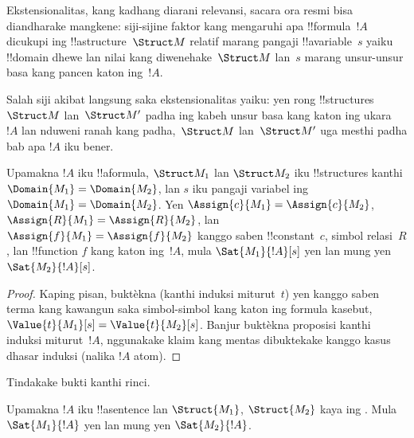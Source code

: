 \documentclass[../../../include/open-logic-section]{subfiles}
\begin{document}


\begin{explain}
Ekstensionalitas, kang kadhang diarani relevansi, sacara
ora resmi bisa diandharake mangkene: siji-sijine faktor
kang mengaruhi apa !!{formula}~$!A$ dicukupi ing
!!a{structure}~$\Struct M$ relatif marang pangaji
!!a{variable}~$s$ yaiku !!{domain} dhewe lan
nilai kang diwenehake~$\Struct M$ lan~$s$ marang
unsur-unsur basa kang pancen katon ing~$!A$.

Salah siji akibat langsung saka ekstensionalitas yaiku:
yen rong !!{structure}s~$\Struct M$ lan~$\Struct M'$
padha ing kabeh unsur basa kang katon ing ukara~$!A$
lan nduweni ranah kang padha,~$\Struct M$ lan~$\Struct M'$
uga mesthi padha bab apa $!A$ iku bener.
\end{explain}

\begin{prop}[Ekstensionalitas]
  Upamakna $!A$ iku !!a{formula}, $\Struct M_1$ lan
  $\Struct M_2$ iku !!{structure}s kanthi
  $\Domain{M_1} = \Domain{M_2}$, lan $s$ iku
  pangaji variabel ing $\Domain{M_1} = \Domain{M_2}$.
  Yen $\Assign{c}{M_1} = \Assign{c}{M_2}$,
  $\Assign{R}{M_1}=\Assign{R}{M_2}$, lan
  $\Assign{f}{M_1} = \Assign{f}{M_2}$ kanggo saben
  !!{constant}~$c$, simbol relasi~$R$, lan
  !!{function} $f$ kang katon ing~$!A$, mula
  $\Sat{M_1}{!A}[s]$ yen lan mung yen $\Sat{M_2}{!A}[s]$.
\end{prop}

\begin{proof}
  Kaping pisan, buktèkna (kanthi induksi miturut~$t$)
  yen kanggo saben terma kang kawangun saka simbol-simbol
  kang katon ing formula kasebut,
  $\Value{t}{M_1}[s] = \Value{t}{M_2}[s]$.
 Banjur buktèkna proposisi kanthi induksi
  miturut~$!A$, nggunakake klaim kang mentas dibuktekake
  kanggo kasus dhasar induksi (nalika $!A$ atom).
\end{proof}

\begin{prob}
Tindakake bukti 
kanthi rinci.
\end{prob}

\begin{cor}
  Upamakna $!A$ iku !!a{sentence} lan $\Struct{M_1}$,
  $\Struct{M_2}$ kaya ing .
  Mula $\Sat{M_1}{!A}$ yen lan mung yen $\Sat{M_2}{!A}$.
\end{cor}
\end{document}
